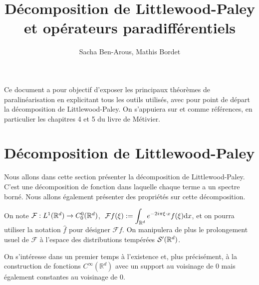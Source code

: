 \documentclass[11pt,a4paper]{article}
\title{\textbf{Décomposition de Littlewood-Paley et opérateurs paradifférentiels}}
\date{}
\author{Sacha Ben-Arous, Mathis Bordet}
\begin{document}
\maketitle



Ce document a pour objectif d'exposer les principaux théorèmes de paralinéarisation en explicitant tous les outils utilisés, avec pour point de départ la décomposition de Littlewood-Paley. On s'appuiera sur \cite{metivier} et \cite{dgv} comme références, en particulier les chapitres 4 et 5 du livre de Métivier.
\section{Décomposition de Littlewood-Paley}
Nous allons dans cette section présenter la décomposition de Littlewood-Paley. C'est une décomposition de fonction dans laquelle chaque terme a un spectre borné. Nous allons également présenter des propriétés sur cette décomposition. 
\begin{defin}
On note $\mathcal{F} : L^1(\mathbb R^d) \to C^0_0(\mathbb R^d)$,  $\ \mathcal{F}f(\xi) := \displaystyle \int_{\mathbb R^d} e^{-2i\pi \xi \cdot x}f(\xi)\mathrm{d}x$, et on pourra utiliser la notation $\hat{f}$ pour désigner $\mathcal{F}f$. On manipulera de plus le prolongement usuel de $\mathcal{F}$ à l'espace des distributions tempérées $\mathcal{S}'(\mathbb R^d)$.
\end{defin}
On s'intéresse dans un premier temps à l'existence et, plus précisément, à la construction de fonctions $C^\infty(\mathbb{R}^d)$ avec un support au voisinage de 0 mais également constantes au voisinage de 0.
\end{document}

